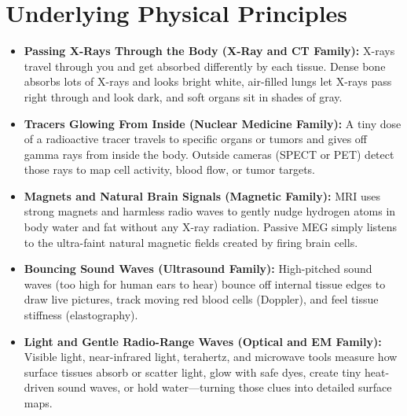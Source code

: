 \section{Underlying Physical Principles}
\begin{itemize}
  \item \textbf{Passing X-Rays Through the Body (X-Ray and CT Family):} X-rays travel through you and get absorbed differently by each tissue. Dense bone absorbs lots of X-rays and looks bright white, air-filled lungs let X-rays pass right through and look dark, and soft organs sit in shades of gray.
  \item \textbf{Tracers Glowing From Inside (Nuclear Medicine Family):} A tiny dose of a radioactive tracer travels to specific organs or tumors and gives off gamma rays from inside the body. Outside cameras (SPECT or PET) detect those rays to map cell activity, blood flow, or tumor targets.
  \item \textbf{Magnets and Natural Brain Signals (Magnetic Family):} MRI uses strong magnets and harmless radio waves to gently nudge hydrogen atoms in body water and fat without any X-ray radiation. Passive MEG simply listens to the ultra-faint natural magnetic fields created by firing brain cells.
  \item \textbf{Bouncing Sound Waves (Ultrasound Family):} High-pitched sound waves (too high for human ears to hear) bounce off internal tissue edges to draw live pictures, track moving red blood cells (Doppler), and feel tissue stiffness (elastography).
  \item \textbf{Light and Gentle Radio-Range Waves (Optical and EM Family):} Visible light, near-infrared light, terahertz, and microwave tools measure how surface tissues absorb or scatter light, glow with safe dyes, create tiny heat-driven sound waves, or hold water---turning those clues into detailed surface maps.
\end{itemize}


